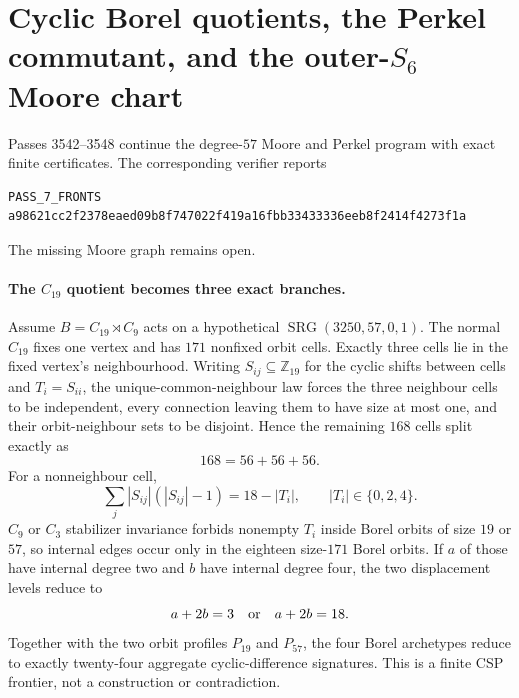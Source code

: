 \section{Cyclic Borel quotients, the Perkel commutant, and the outer-$S_6$ Moore chart}
\label{sec:bt3542-3548-borel-outer-s6}

Passes 3542--3548 continue the degree-$57$ Moore and Perkel program with exact finite certificates.  The corresponding verifier reports
\begin{verbatim}
PASS_7_FRONTS a98621cc2f2378eaed09b8f747022f419a16fbb33433336eeb8f2414f4273f1a
\end{verbatim}
The missing Moore graph remains open.

\paragraph{The $C_{19}$ quotient becomes three exact branches.}
Assume $B=C_{19}\rtimes C_9$ acts on a hypothetical $\operatorname{SRG}(3250,57,0,1)$.  The normal $C_{19}$ fixes one vertex and has $171$ nonfixed orbit cells.  Exactly three cells lie in the fixed vertex's neighbourhood.  Writing $S_{ij}\subseteq\mathbb Z_{19}$ for the cyclic shifts between cells and $T_i=S_{ii}$, the unique-common-neighbour law forces the three neighbour cells to be independent, every connection leaving them to have size at most one, and their orbit-neighbour sets to be disjoint.  Hence the remaining $168$ cells split exactly as
\[
168=56+56+56.
\]
For a nonneighbour cell,
\[
\sum_j |S_{ij}|(|S_{ij}|-1)=18-|T_i|,
\qquad |T_i|\in\{0,2,4\}.
\]
$C_9$ or $C_3$ stabilizer invariance forbids nonempty $T_i$ inside Borel orbits of size $19$ or $57$, so internal edges occur only in the eighteen size-$171$ Borel orbits.  If $a$ of those have internal degree two and $b$ have internal degree four, the two displacement levels reduce to
\[
a+2b=3\quad\hbox{or}\quad a+2b=18.
\]
Together with the two orbit profiles $P_{19}$ and $P_{57}$, the four Borel archetypes reduce to exactly twenty-four aggregate cyclic-difference signatures.  This is a finite CSP frontier, not a construction or contradiction.

